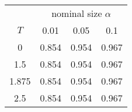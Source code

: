 % 
\begin{tabular}{cccc}
  \hline
  & \multicolumn{3}{c}{nominal size $\alpha$} \\
 $T$ & 0.01 & 0.05 & 0.1 \\
 \hline
0 & 0.854 & 0.954 & 0.967 \\ 
  1.5 & 0.854 & 0.954 & 0.967 \\ 
  1.875 & 0.854 & 0.954 & 0.967 \\ 
  2.5 & 0.854 & 0.954 & 0.967 \\ 
   \hline
\end{tabular}

